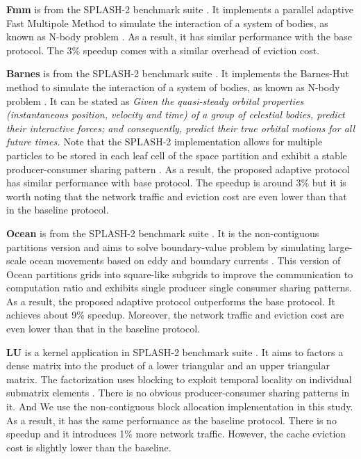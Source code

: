 \documentclass[11pt,conference]{IEEEtran}
\begin{document}
\textbf{Fmm} is from the SPLASH-2 benchmark suite \cite{splash}. It implements a parallel adaptive Fast Multipole Method
to simulate the interaction of a system of bodies, as known as N-body problem \cite{nbody}. As a result, it has similar performance with the base protocol. The 3\% speedup comes with a similar overhead of eviction cost.

\textbf{Barnes} is from the SPLASH-2 benchmark suite \cite{splash}. It implements the Barnes-Hut method to simulate the interaction of a system of bodies, as known as N-body problem \cite{nbody}. It can be stated as \textit{Given the quasi-steady orbital properties (instantaneous position, velocity and time) of a group of celestial bodies, predict their interactive forces; and consequently, predict their true orbital motions for all future times. \cite{nbody_wiki}} Note that the SPLASH-2 implementation allows for multiple particles to be stored in each leaf cell of the space partition and exhibit a stable producer-consumer sharing pattern \cite{barnes}. As a result, the proposed adaptive protocol has similar performance with base protocol. The speedup is around 3\% but it is worth noting that the network traffic and eviction cost are even lower than that in the baseline protocol.

\textbf{Ocean} is from the SPLASH-2 benchmark suite \cite{splash}. It is the non-contiguous partitions version and aims to solve boundary-value problem by simulating large-scale ocean movements based on eddy and boundary currents \cite{ocean}. This version of Ocean partitions grids into square-like subgrids to improve the communication to computation ratio and exhibits single producer single consumer sharing patterns. As a result, the proposed adaptive protocol outperforms the base protocol. It achieves about 9\% speedup. Moreover, the network traffic and eviction cost are even lower than that in the baseline protocol.

\textbf{LU} is a kernel application in SPLASH-2 benchmark suite \cite{splash}. It aims to factors a dense matrix into the product of a lower triangular and an upper triangular matrix.  The factorization uses blocking to exploit temporal locality on individual submatrix elements \cite{lu}. There is no obvious producer-consumer sharing patterns in it. And We use the non-contiguous block allocation implementation in this study. As a result, it has the same performance as the baseline protocol. There is no speedup and it introduces 1\% more network traffic. However, the cache eviction cost is slightly lower than the baseline.
\end{document}
